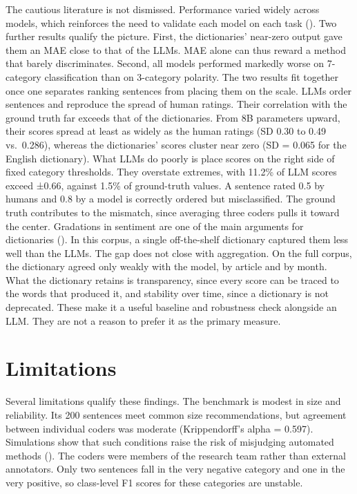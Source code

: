 \documentclass[
  man,
  floatsintext,
  longtable,
  nolmodern,
  notxfonts,
  notimes,
  colorlinks=true,linkcolor=blue,citecolor=blue,urlcolor=blue]{apa7}
\begin{document}
The cautious literature is not dismissed. Performance varied widely
across models, which reinforces the need to validate each model on each
task (). Two further results qualify the picture. First, the
dictionaries' near-zero output gave them an MAE close to that of the
LLMs. MAE alone can thus reward a method that barely discriminates.
Second, all models performed markedly worse on 7-category classification
than on 3-category polarity. The two results fit together once one
separates ranking sentences from placing them on the scale. LLMs order
sentences and reproduce the spread of human ratings. Their correlation
with the ground truth far exceeds that of the dictionaries. From 8B
parameters upward, their scores spread at least as widely as the human
ratings (SD 0.30 to 0.49 vs.~0.286), whereas the dictionaries' scores
cluster near zero (SD = 0.065 for the English dictionary). What LLMs do
poorly is place scores on the right side of fixed category thresholds.
They overstate extremes, with 11.2\% of LLM scores exceed ±0.66, against
1.5\% of ground-truth values. A sentence rated 0.5 by humans and 0.8 by
a model is correctly ordered but misclassified. The ground truth
contributes to the mismatch, since averaging three coders pulls it
toward the center. Gradations in sentiment are one of the main arguments
for dictionaries
(). In this corpus, a single off-the-shelf
dictionary captured them less well than the LLMs. The gap does not close
with aggregation. On the full corpus, the dictionary agreed only weakly
with the model, by article and by month. What the dictionary retains is
transparency, since every score can be traced to the words that produced
it, and stability over time, since a dictionary is not deprecated. These
make it a useful baseline and robustness check alongside an LLM. They
are not a reason to prefer it as the primary measure.

\section{Limitations}\label{limitations}

Several limitations qualify these findings. The benchmark is modest in
size and reliability. Its 200 sentences meet common size
recommendations, but agreement between individual coders was moderate
(Krippendorff's alpha = 0.597). Simulations show that such conditions
raise the risk of misjudging automated methods
(). The
coders were members of the research team rather than external
annotators. Only two sentences fall in the very negative category and
one in the very positive, so class-level F1 scores for these categories
are unstable.
\end{document}
